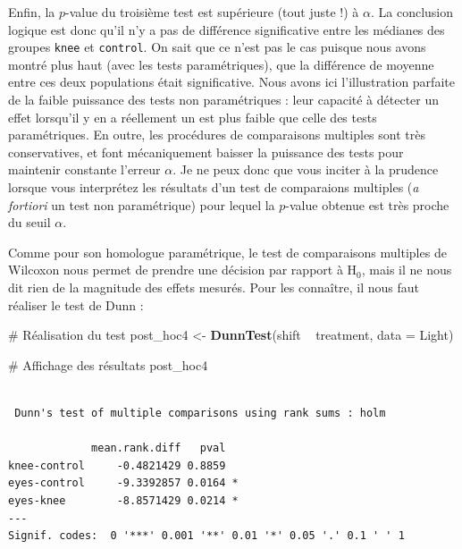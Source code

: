 \documentclass[a4paperpaper,]{article}
\newenvironment{Shaded}{\begin{snugshade}}{\end{snugshade}}
\newcommand{\CommentTok}[1]{\textcolor[rgb]{0.54,0.53,0.53}{#1}}
\newcommand{\DataTypeTok}[1]{\textcolor[rgb]{0.00,0.34,0.68}{#1}}
\newcommand{\KeywordTok}[1]{\textcolor[rgb]{0.12,0.11,0.11}{\textbf{#1}}}
\newcommand{\NormalTok}[1]{\textcolor[rgb]{0.12,0.11,0.11}{#1}}
\newcommand{\OperatorTok}[1]{\textcolor[rgb]{0.12,0.11,0.11}{#1}}
\newcommand{\StringTok}[1]{\textcolor[rgb]{0.75,0.01,0.01}{#1}}
\begin{document}
Enfin, la \(p\)-value du troisième test est supérieure (tout juste !) à \(\alpha\). La conclusion logique est donc qu'il n'y a pas de différence significative entre les médianes des groupes \texttt{knee} et \texttt{control}. On sait que ce n'est pas le cas puisque nous avons montré plus haut (avec les tests paramétriques), que la différence de moyenne entre ces deux populations était significative. Nous avons ici l'illustration parfaite de la faible puissance des tests non paramétriques : leur capacité à détecter un effet lorsqu'il y en a réellement un est plus faible que celle des tests paramétriques. En outre, les procédures de comparaisons multiples sont très conservatives, et font mécaniquement baisser la puissance des tests pour maintenir constante l'erreur \(\alpha\). Je ne peux donc que vous inciter à la prudence lorsque vous interprétez les résultats d'un test de comparaions multiples (\emph{a fortiori} un test non paramétrique) pour lequel la \(p\)-value obtenue est très proche du seuil \(\alpha\).

Comme pour son homologue paramétrique, le test de comparaisons multiples de Wilcoxon nous permet de prendre une décision par rapport à H\(_0\), mais il ne nous dit rien de la magnitude des effets mesurés. Pour les connaître, il nous faut réaliser le test de Dunn :

\begin{Shaded}
\begin{Highlighting}[]
\CommentTok{# Réalisation du test}
\NormalTok{post_hoc4 <-}\StringTok{ }\KeywordTok{DunnTest}\NormalTok{(shift }\OperatorTok{~}\StringTok{ }\NormalTok{treatment, }\DataTypeTok{data =}\NormalTok{ Light)}

\CommentTok{# Affichage des résultats}
\NormalTok{post_hoc4}
\end{Highlighting}
\end{Shaded}

\begin{verbatim}

 Dunn's test of multiple comparisons using rank sums : holm  

             mean.rank.diff   pval    
knee-control     -0.4821429 0.8859    
eyes-control     -9.3392857 0.0164 *  
eyes-knee        -8.8571429 0.0214 *  
---
Signif. codes:  0 '***' 0.001 '**' 0.01 '*' 0.05 '.' 0.1 ' ' 1
\end{verbatim}
\end{document}
